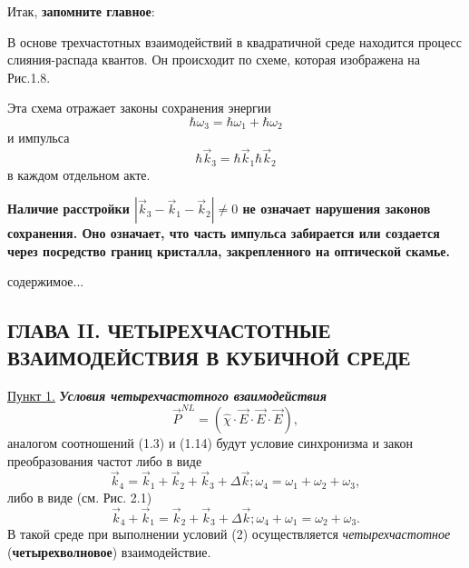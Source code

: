 \documentclass[a4paper]{article}
\begin{document}
	Итак, \textbf{запомните главное}:
	
	В основе трехчастотных взаимодействий в квадратичной среде находится процесс слияния-распада квантов. Он происходит по схеме, которая изображена на Рис.1.8. 
	
	\begin{minipage}{0.5\textwidth}
		\begin{flushleft}
			Эта схема отражает законы сохранения энергии $$\hbar\omega_{3}=\hbar\omega_{1}+\hbar\omega_{2}$$ и импульса $$\hbar\vec{k}_{3}=\hbar\vec{k}_{1}\hbar\vec{k}_{2}$$ в каждом отдельном акте. 
			
			\textbf{Наличие расстройки $|\vec{k}_{3}-\vec{k}_{1}-\vec{k}_{2}|\neq0$ не означает нарушения законов сохранения. Оно означает, что часть импульса забирается или создается через посредство границ кристалла, закрепленного на оптической скамье. }
		\end{flushleft}		
	\end{minipage}
	\begin{minipage}{0.5\textwidth}
		\begin{flushright}
			содержимое...
		\end{flushright}
	\end{minipage}
	\setcounter{equation}{0}
	\newpage
	\begin{center}
		\section*{\textbf{\huge ГЛАВА II. ЧЕТЫРЕХЧАСТОТНЫЕ ВЗАИМОДЕЙСТВИЯ 
				В КУБИЧНОЙ СРЕДЕ}}		  		
	\end{center}

	\underline{Пункт 1.} \textbf{\textit{Условия четырехчастотного взаимодействия }}
	\begin{equation}
		\vec{P}^{NL}=(\hat{\chi}\cdot\vec{E}\cdot\vec{E}\cdot\vec{E}),\label{1.3}
	\end{equation}
	аналогом соотношений (1.3) и (1.14) будут условие синхронизма и закон преобразования частот либо в виде 
	\begin{equation}
		\vec{k}_{4}=\vec{k}_{1}+\vec{k}_{2}+\vec{k}_{3}+\Delta\vec{k};\omega_{4}=\omega_{1}+\omega_{2}+\omega_{3},
		\tag{2a}\label{2a}
	\end{equation}
	либо в виде (см. Рис. 2.1)
		\begin{equation}
		\vec{k}_{4}+\vec{k}_{1}=\vec{k}_{2}+\vec{k}_{3}+\Delta\vec{k};\omega_{4}+\omega_{1}=\omega_{2}+\omega_{3}.
		\tag{2б}\label{2b}
	\end{equation}
	\setcounter{equation}{2}
	В такой среде при выполнении условий (2) осуществляется \textit{четырехчастотное} (\textbf{четырехволновое}) взаимодействие.	
	\vspace{3cm}
	
\end{document}
